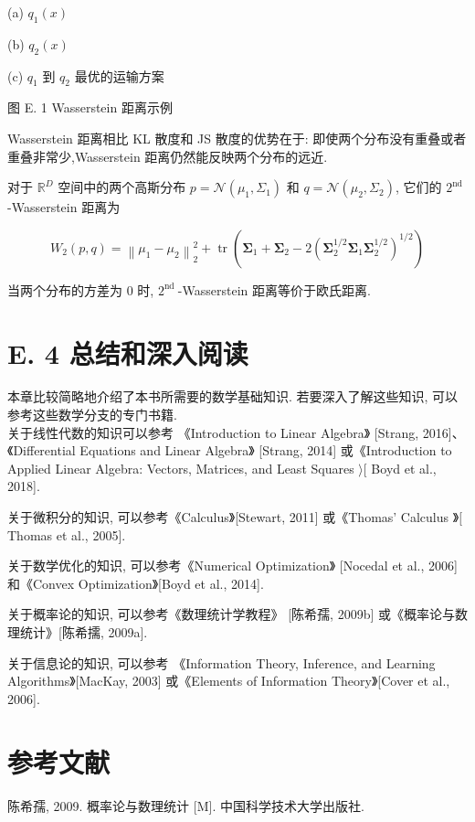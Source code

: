 \documentclass[10pt]{article}
\begin{document}
(a) $q_{1}(x)$



(b) $q_{2}(x)$



(c) $q_{1}$ 到 $q_{2}$ 最优的运输方案

图 E. 1 Wasserstein 距离示例

Wasserstein 距离相比 KL 散度和 JS 散度的优势在于: 即使两个分布没有重叠或者重叠非常少,Wasserstein 距离仍然能反映两个分布的远近.

对于 $\mathbb{R}^{D}$ 空间中的两个高斯分布 $p=\mathcal{N}\left(\mu_{1}, \Sigma_{1}\right)$ 和 $q=\mathcal{N}\left(\mu_{2}, \Sigma_{2}\right)$, 它们的 $2^{\text {nd }}$-Wasserstein 距离为


\begin{equation*}
W_{2}(p, q)=\left\|\mu_{1}-\mu_{2}\right\|_{2}^{2}+\operatorname{tr}\left(\boldsymbol{\Sigma}_{1}+\boldsymbol{\Sigma}_{2}-2\left(\boldsymbol{\Sigma}_{2}^{1 / 2} \boldsymbol{\Sigma}_{1} \boldsymbol{\Sigma}_{2}^{1 / 2}\right)^{1 / 2}\right) \tag{E.21}
\end{equation*}


当两个分布的方差为 0 时, $2^{\text {nd }}$-Wasserstein 距离等价于欧氏距离.

\section*{E. 4 总结和深入阅读}
本章比较简略地介绍了本书所需要的数学基础知识. 若要深入了解这些知识, 可以参考这些数学分支的专门书籍.\\
关于线性代数的知识可以参考 《Introduction to Linear Algebra》 [Strang, 2016]、《Differential Equations and Linear Algebra》 [Strang, 2014] 或《Introduction to Applied Linear Algebra: Vectors, Matrices, and Least Squares $\rangle[$ Boyd et al., 2018].

关于微积分的知识, 可以参考《Calculus》[Stewart, 2011] 或《Thomas' Calculus $》[$ Thomas et al., 2005].

关于数学优化的知识, 可以参考《Numerical Optimization》 [Nocedal et al., 2006] 和《Convex Optimization》[Boyd et al., 2014].

关于概率论的知识, 可以参考《数理统计学教程》 [陈希孺, 2009b] 或《概率论与数理统计》[陈希擩, 2009a].

关于信息论的知识, 可以参考 《Information Theory, Inference, and Learning Algorithms》[MacKay, 2003] 或《Elements of Information Theory》[Cover et al., 2006].

\section*{参考文献}
陈希孺, 2009. 概率论与数理统计 [M]. 中国科学技术大学出版社.
\end{document}
